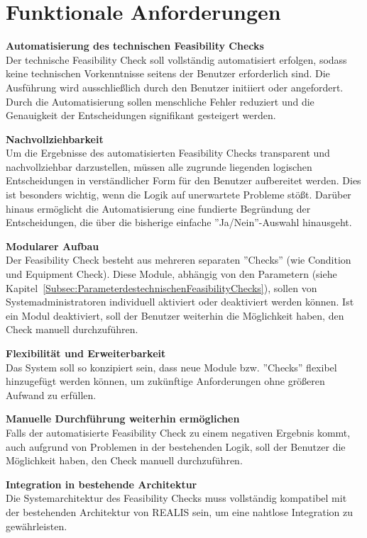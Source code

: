 \section{Funktionale Anforderungen} \label{Sec:funktionale-anforderungen}

\setlength{\leftskip}{1em} 
\textbf{Automatisierung des technischen Feasibility Checks}  \\
Der technische Feasibility Check soll vollständig automatisiert erfolgen, sodass keine technischen Vorkenntnisse seitens der Benutzer erforderlich sind. Die Ausführung wird ausschließlich durch den Benutzer initiiert oder angefordert. Durch die Automatisierung sollen menschliche Fehler reduziert und die Genauigkeit der Entscheidungen signifikant gesteigert werden.

\textbf{Nachvollziehbarkeit}  \\
Um die Ergebnisse des automatisierten Feasibility Checks transparent und nachvollziehbar darzustellen, müssen alle zugrunde liegenden logischen Entscheidungen in verständlicher Form für den Benutzer aufbereitet werden. Dies ist besonders wichtig, wenn die Logik auf unerwartete Probleme stößt. Darüber hinaus ermöglicht die Automatisierung eine fundierte Begründung der Entscheidungen, die über die bisherige einfache ''Ja/Nein''-Auswahl hinausgeht.

\textbf{Modularer Aufbau}  \\
Der Feasibility Check besteht aus mehreren separaten ''Checks'' (wie Condition und Equipment Check). Diese Module, abhängig von den Parametern (siehe Kapitel~\ref{Subsec:ParameterdestechnischenFeasibilityChecks}), sollen von Systemadministratoren individuell aktiviert oder deaktiviert werden können. Ist ein Modul deaktiviert, soll der Benutzer weiterhin die Möglichkeit haben, den Check manuell durchzuführen.

\textbf{Flexibilität und Erweiterbarkeit}  \\
Das System soll so konzipiert sein, dass neue Module bzw. ''Checks'' flexibel hinzugefügt werden können, um zukünftige Anforderungen ohne größeren Aufwand zu erfüllen.

\textbf{Manuelle Durchführung weiterhin ermöglichen}  \\
Falls der automatisierte Feasibility Check zu einem negativen Ergebnis kommt, auch aufgrund von Problemen in der bestehenden Logik, soll der Benutzer die Möglichkeit haben, den Check manuell durchzuführen.

\textbf{Integration in bestehende Architektur}  \\
Die Systemarchitektur des Feasibility Checks muss vollständig kompatibel mit der bestehenden Architektur von \gls{REALIS} sein, um eine nahtlose Integration zu gewährleisten.

\setlength{\leftskip}{0em} 
